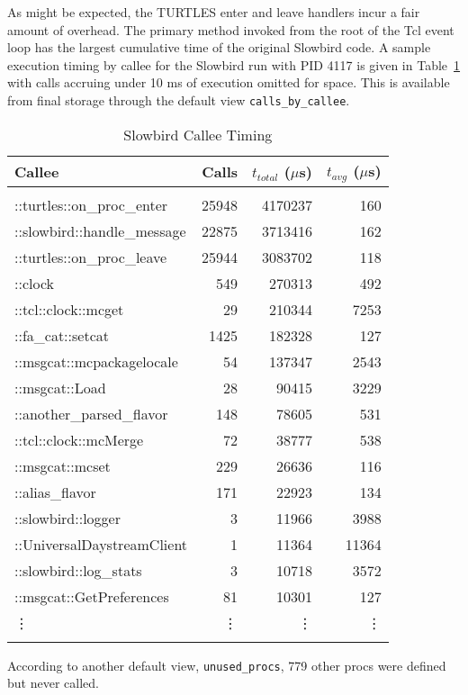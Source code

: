 \documentclass{article}[letter,10pt]
\begin{document}
{{{        As might be expected, the TURTLES enter and leave handlers incur a fair amount of overhead.
        The primary method invoked from the root of the Tcl event loop has the largest cumulative time of the
        original Slowbird code. A sample execution timing by callee for the Slowbird run with PID 4117 is given in Table~\ref{tbl:slowbirdt}
        with calls accruing under 10 ms of execution omitted for space.
        This is available from final storage through the default view \texttt{calls\_by\_callee}.
        
        {\footnotesize
        \begin{longtable}{l r r r}
          \toprule
          Callee & Calls & $t_{total}$ ($\mu$s) & $t_{avg}$ ($\mu$s) \\
          \midrule \\
          \endhead
          ::turtles::on\_proc\_enter & 25948 & 4170237 & 160 \\
          ::slowbird::handle\_message & 22875 & 3713416 & 162 \\
          ::turtles::on\_proc\_leave & 25944 & 3083702 & 118 \\
          ::clock & 549 & 270313 & 492 \\
          ::tcl::clock::mcget & 29 & 210344 & 7253 \\
          ::fa\_cat::setcat & 1425 & 182328 & 127 \\
          ::msgcat::mcpackagelocale & 54 & 137347 & 2543 \\
          ::msgcat::Load & 28 & 90415 & 3229 \\
          ::another\_parsed\_flavor & 148 & 78605 & 531 \\
          ::tcl::clock::mcMerge & 72 & 38777 & 538 \\
          ::msgcat::mcset & 229 & 26636 & 116 \\
          ::alias\_flavor & 171 & 22923 & 134 \\
          ::slowbird::logger & 3 & 11966 & 3988 \\
          ::UniversalDaystreamClient & 1 & 11364 & 11364 \\
          ::slowbird::log\_stats & 3 & 10718 & 3572 \\
          ::msgcat::GetPreferences & 81 & 10301 & 127 \\
          \vdots & \vdots & \vdots & \vdots \\
          \bottomrule
          \caption{Slowbird Callee Timing}
          \label{tbl:slowbirdt}
        \end{longtable}}
        According to another default view, \texttt{unused\_procs}, 779 other procs were defined but never called.

}}}
\end{document}
